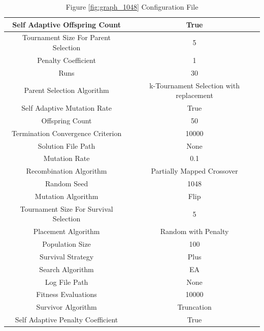 \documentclass{standalone}
\begin{document}
\begin{table}[!htb]
	\centering
	\caption{Figure \ref{fig:graph_1048} Configuration File}
	\label{tab:graph_1048}
	\begin{tabular}{| c | c |}
		\hline
		Self Adaptive Offspring Count		& True		 \\
		\hline
		Tournament Size For Parent Selection		& 5		 \\
		\hline
		Penalty Coefficient		& 1		 \\
		\hline
		Runs		& 30		 \\
		\hline
		Parent Selection Algorithm		& k-Tournament Selection with replacement		 \\
		\hline
		Self Adaptive Mutation Rate		& True		 \\
		\hline
		Offspring Count		& 50		 \\
		\hline
		Termination Convergence Criterion		& 10000		 \\
		\hline
		Solution File Path		& None		 \\
		\hline
		Mutation Rate		& 0.1		 \\
		\hline
		Recombination Algorithm		& Partially Mapped Crossover		 \\
		\hline
		Random Seed		& 1048		 \\
		\hline
		Mutation Algorithm		& Flip		 \\
		\hline
		Tournament Size For Survival Selection		& 5		 \\
		\hline
		Placement Algorithm		& Random with Penalty		 \\
		\hline
		Population Size		& 100		 \\
		\hline
		Survival Strategy		& Plus		 \\
		\hline
		Search Algorithm		& EA		 \\
		\hline
		Log File Path		& None		 \\
		\hline
		Fitness Evaluations		& 10000		 \\
		\hline
		Survivor Algorithm		& Truncation		 \\
		\hline
		Self Adaptive Penalty Coefficient		& True		 \\
		\hline
	\end{tabular}
\end{table}
\end{document}
